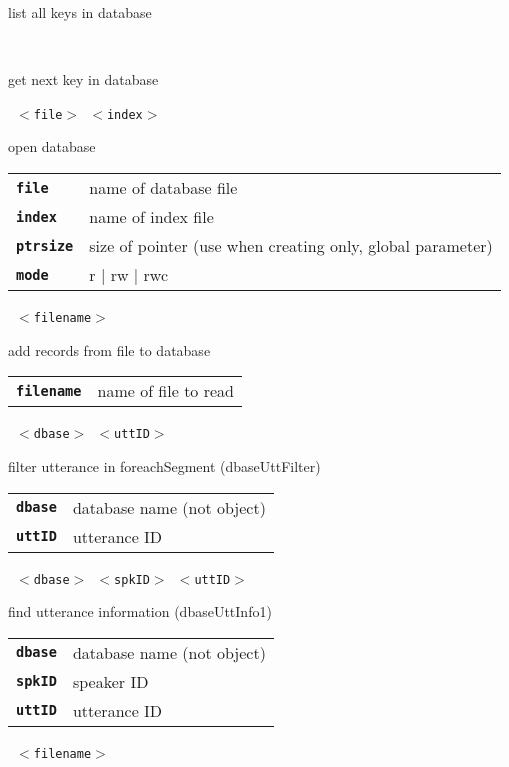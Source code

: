 \begin{description}
\begin{description}
        list all keys in database

       \texttt{} \

        get next key in database

       \texttt{ $<$file$>$ $<$index$>$  } \

        open database

      \begin{tabular}{ll}
 \texttt{\textbf{file}} &    name of database file  \\
 \texttt{\textbf{index}} &   name of index file  \\
 \texttt{\textbf{ptrsize}} &  size of pointer (use when creating only, global parameter)  \\
 \texttt{\textbf{mode}} &     r | rw | rwc  \\
      \end{tabular}
       \texttt{ $<$filename$>$} \

        add records from file to database

      \begin{tabular}{ll}
 \texttt{\textbf{filename}} &  name of file to read  \\
      \end{tabular}
       \texttt{ $<$dbase$>$ $<$uttID$>$} \

        filter utterance in foreachSegment (dbaseUttFilter)

      \begin{tabular}{ll}
 \texttt{\textbf{dbase}} &      database name (not object)  \\
 \texttt{\textbf{uttID}} &      utterance ID  \\
      \end{tabular}
       \texttt{ $<$dbase$>$ $<$spkID$>$ $<$uttID$>$} \

        find utterance information (dbaseUttInfo1)

      \begin{tabular}{ll}
 \texttt{\textbf{dbase}} &      database name (not object)  \\
 \texttt{\textbf{spkID}} &      speaker ID  \\
 \texttt{\textbf{uttID}} &      utterance ID  \\
      \end{tabular}
       \texttt{ $<$filename$>$} \


\end{description}
\end{description}

